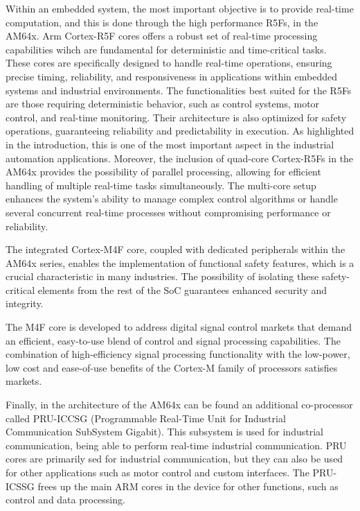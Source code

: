 Within an embedded system, the most important objective is to provide real-time
computation, and this is done through the high performance R5Fs, in the AM64x.
Arm Cortex-R5F cores offers a robust set of real-time processing capabilities
wihch are fundamental for deterministic and time-critical tasks.
These cores are specifically designed to handle real-time operations, ensuring
precise timing, reliability, and responsiveness in applications within embedded
systems and industrial environments.
The functionalities best suited for the R5Fs are those requiring deterministic
behavior, such as control systems, motor control, and real-time monitoring.
Their architecture is also optimized for safety operations, guaranteeing 
reliability and predictability in execution.
As highlighted in the introduction, this is one of the most important aspect
in the industrial automation applications.
Moreover, the inclusion of quad-core Cortex-R5Fs in the AM64x provides the
possibility of parallel processing, allowing for efficient handling of multiple
real-time tasks simultaneously. The multi-core setup enhances the system's
ability to manage complex control algorithms or handle several concurrent
real-time processes without compromising performance or reliability.

The integrated Cortex-M4F core, coupled with dedicated peripherals within the
AM64x series, enables the implementation of functional safety features,
which is a crucial characteristic in many industries.
The possibility of isolating these safety-critical elements from the rest
of the SoC guarantees enhanced security and integrity.

The M4F core is developed to address digital signal control markets that demand
an efficient, easy-to-use blend of control and signal processing capabilities.
\cite{ARM_M4}
The combination of high-efficiency signal processing functionality with the
low-power, low cost and ease-of-use benefits of the Cortex-M family of
processors satisfies markets.

Finally, in the architecture of the AM64x can be found an additional
co-processor called PRU-ICCSG (Programmable Real-Time Unit for Industrial
Communication SubSystem Gigabit). This subsystem is used for industrial
communication, being able to perform real-time industrial communication.
PRU cores are primarily sed for industrial communication, but they can also
be used for other applications such as motor control and custom interfaces.
The PRU-ICSSG frees up the main ARM cores in the device for other functions,
such as control and data processing.

